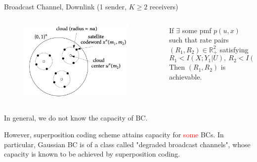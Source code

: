 \documentclass[aspectratio=43, 10pt]{beamer}
\begin{document}
    \begin{frame}[t]{Broadcast Channel, Downlink \small (1 sender, $K\geq2$ receivers)}
        \vspace{-1em}
        \begin{columns}
            \begin{column}{0.4\textwidth}
                \begin{figure}
                \centering
                    \includegraphics[width=0.9\textwidth]{figures/superpositioncoding.png}
                \end{figure}
            \end{column}
    
            \begin{column}{0.6\textwidth}
                \small
                \begin{theorem}
                    If $\exists$ some pmf $p(u,x)$ such that rate pairs $(R_1,R_2)\in \mathbb{R}_+^2$ satisfying 
                    $$R_1 < I(X;Y_1|U),~ R_2 < I(U;Y_2),~ R_1+ R_2<I(X;Y_1).$$ Then $(R_1,R_2)$ is achievable. 
                \end{theorem}
            \end{column}
        \end{columns}

        \vfill
        
        In general, we do not know the capacity of BC. 
        
        However, superposition coding scheme attains capacity for \textcolor{red}{some} BCs. In particular, Gaussian BC is of a class called "degraded broadcast channels", whose capacity is known to be achieved by superposition coding. 
        

\end{frame}
\end{document}
